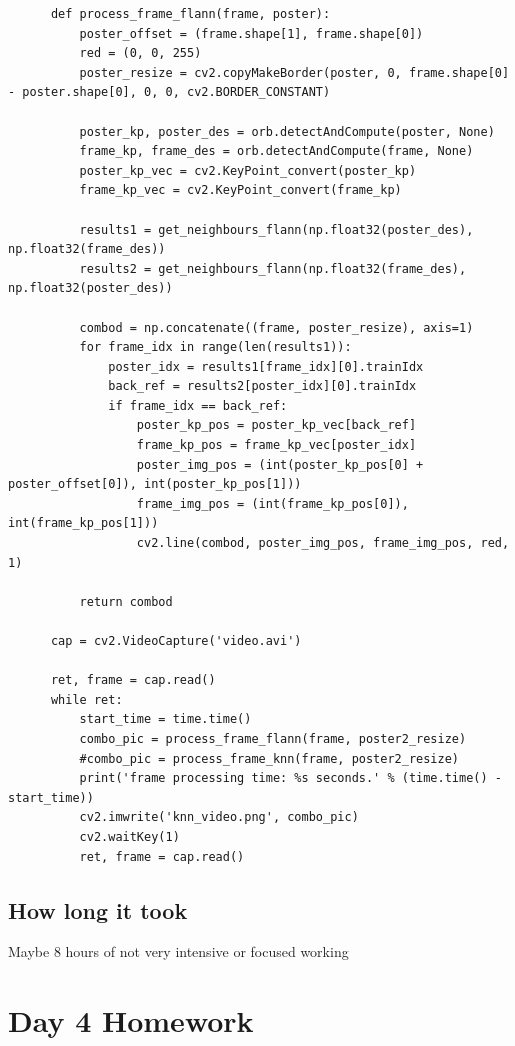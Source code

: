 \documentclass{article}
\begin{document}
\begin{verbatim}
      def process_frame_flann(frame, poster):
          poster_offset = (frame.shape[1], frame.shape[0])
          red = (0, 0, 255)
          poster_resize = cv2.copyMakeBorder(poster, 0, frame.shape[0] - poster.shape[0], 0, 0, cv2.BORDER_CONSTANT)

          poster_kp, poster_des = orb.detectAndCompute(poster, None)
          frame_kp, frame_des = orb.detectAndCompute(frame, None)
          poster_kp_vec = cv2.KeyPoint_convert(poster_kp)
          frame_kp_vec = cv2.KeyPoint_convert(frame_kp)

          results1 = get_neighbours_flann(np.float32(poster_des), np.float32(frame_des))
          results2 = get_neighbours_flann(np.float32(frame_des), np.float32(poster_des))

          combod = np.concatenate((frame, poster_resize), axis=1)
          for frame_idx in range(len(results1)):
              poster_idx = results1[frame_idx][0].trainIdx
              back_ref = results2[poster_idx][0].trainIdx
              if frame_idx == back_ref:
                  poster_kp_pos = poster_kp_vec[back_ref]
                  frame_kp_pos = frame_kp_vec[poster_idx]
                  poster_img_pos = (int(poster_kp_pos[0] + poster_offset[0]), int(poster_kp_pos[1]))
                  frame_img_pos = (int(frame_kp_pos[0]), int(frame_kp_pos[1]))
                  cv2.line(combod, poster_img_pos, frame_img_pos, red, 1)

          return combod

      cap = cv2.VideoCapture('video.avi')

      ret, frame = cap.read()
      while ret:
          start_time = time.time()
          combo_pic = process_frame_flann(frame, poster2_resize)
          #combo_pic = process_frame_knn(frame, poster2_resize)
          print('frame processing time: %s seconds.' % (time.time() - start_time))
          cv2.imwrite('knn_video.png', combo_pic)
          cv2.waitKey(1)
          ret, frame = cap.read()
  \end{verbatim}

  \subsection{How long it took}
  Maybe 8 hours of not very intensive or focused working

 \section{Day 4 Homework}
\end{document}
